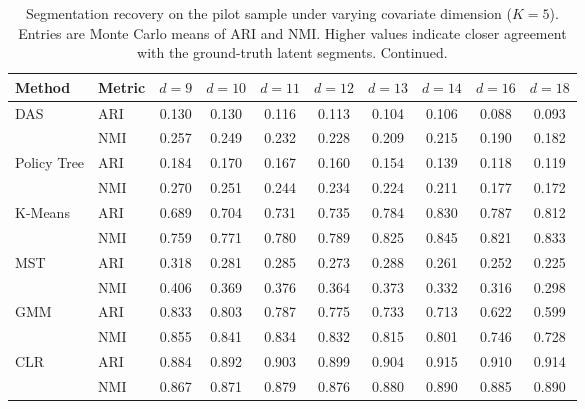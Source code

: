 \begin{table}[htbp]
\centering
\caption{Segmentation recovery on the pilot sample under varying covariate dimension ($K=5$). Entries are Monte Carlo means of ARI and NMI. Higher values indicate closer agreement with the ground-truth latent segments. Continued.}
\label{tab:app-ari-nmi-varying-d-cont}
\begin{tabular}{llcccccccc}
\toprule
Method & Metric & $d=9$ & $d=10$ & $d=11$ & $d=12$ & $d=13$ & $d=14$ & $d=16$ & $d=18$ \\
\midrule
DAS & ARI & 0.130 & 0.130 & 0.116 & 0.113 & 0.104 & 0.106 & 0.088 & 0.093 \\
 & NMI & 0.257 & 0.249 & 0.232 & 0.228 & 0.209 & 0.215 & 0.190 & 0.182 \\
\addlinespace
Policy Tree & ARI & 0.184 & 0.170 & 0.167 & 0.160 & 0.154 & 0.139 & 0.118 & 0.119 \\
 & NMI & 0.270 & 0.251 & 0.244 & 0.234 & 0.224 & 0.211 & 0.177 & 0.172 \\
\addlinespace
K-Means & ARI & 0.689 & 0.704 & 0.731 & 0.735 & 0.784 & 0.830 & 0.787 & 0.812 \\
 & NMI & 0.759 & 0.771 & 0.780 & 0.789 & 0.825 & 0.845 & 0.821 & 0.833 \\
\addlinespace
MST & ARI & 0.318 & 0.281 & 0.285 & 0.273 & 0.288 & 0.261 & 0.252 & 0.225 \\
 & NMI & 0.406 & 0.369 & 0.376 & 0.364 & 0.373 & 0.332 & 0.316 & 0.298 \\
\addlinespace
GMM & ARI & 0.833 & 0.803 & 0.787 & 0.775 & 0.733 & 0.713 & 0.622 & 0.599 \\
 & NMI & 0.855 & 0.841 & 0.834 & 0.832 & 0.815 & 0.801 & 0.746 & 0.728 \\
\addlinespace
CLR & ARI & 0.884 & 0.892 & 0.903 & 0.899 & 0.904 & 0.915 & 0.910 & 0.914 \\
 & NMI & 0.867 & 0.871 & 0.879 & 0.876 & 0.880 & 0.890 & 0.885 & 0.890 \\
\bottomrule
\end{tabular}
\end{table}


